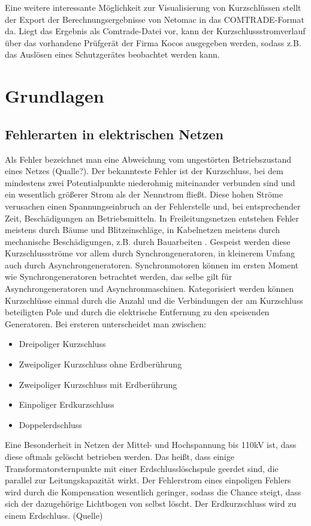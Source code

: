 \documentclass{scrartcl}
\begin{document}
\begin{onehalfspace}
Eine weitere interessante Möglichkeit zur Visualisierung von Kurzschlüssen stellt der Export der Berechnungsergebnisse von Netomac in das COMTRADE-Format da. Liegt das Ergebnis als Comtrade-Datei vor, kann der Kurzschlussstromverlauf über das vorhandene Prüfgerät der Firma Kocos ausgegeben werden, sodass z.B. das Auslösen eines Schutzgerätes beobachtet werden kann.

\section{Grundlagen}


\subsection{Fehlerarten in elektrischen Netzen}
Als Fehler bezeichnet man eine Abweichung vom ungestörten Betriebszustand eines Netzes (Qualle?). Der bekannteste Fehler ist der Kurzschluss, bei dem mindestens zwei Potentialpunkte niederohmig miteinander verbunden sind und ein wesentlich größerer Strom als der Nennstrom fließt. Diese hohen Ströme verusachen einen Spannungseinbruch an der Fehlerstelle und, bei entsprechender Zeit, Beschädigungen an Betriebsmitteln. In Freileitungsnetzen entstehen Fehler meistens durch Bäume und Blitzeinschläge, in Kabelnetzen meistens durch mechanische Beschädigungen, z.B. durch Bauarbeiten \cite[S. 57]{Pistora2013}. Gespeist werden diese Kurzschlussströme vor allem durch Synchrongeneratoren, in kleinerem Umfang auch durch Asynchrongeneratoren. Synchronmotoren können im ersten Moment wie Synchrongeneratoren betrachtet werden, das selbe gilt für Asynchrongeneratoren und Asynchronmaschinen. Kategorisiert werden können Kurzschlüsse einmal durch die Anzahl und die Verbindungen der am Kurzschluss beteiligten Pole und durch die elektrische Entfernung zu den speisenden Generatoren. Bei ersteren unterscheidet man zwischen:

\begin{itemize}
\item Dreipoliger Kurzschluss
\item Zweipoliger Kurzschluss ohne Erdberührung
\item Zweipoliger Kurzschluss mit Erdberührung
\item Einpoliger Erdkurzschluss
\item Doppelerdschluss
\end{itemize}

Eine Besonderheit in Netzen der Mittel- und Hochspannung bis 110kV ist, dass diese oftmals gelöscht betrieben werden. Das heißt, dass einige Transformatorsternpunkte mit einer Erdschlusslöschspule geerdet sind, die parallel zur Leitungskapazität wirkt. Der Fehlerstrom eines einpoligen Fehlers wird durch die Kompensation wesentlich geringer, sodass die Chance steigt, dass sich der dazugehörige Lichtbogen von selbst löscht. Der Erdkurzschluss wird zu einem Erdschluss. (Quelle)


\end{onehalfspace}
\end{document}
